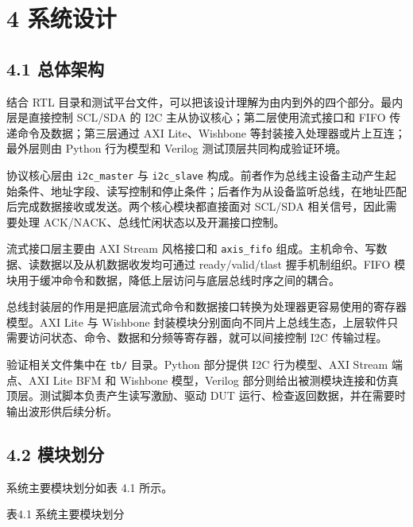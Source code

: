 \section{4 系统设计}\label{ux7cfbux7edfux8bbeux8ba1}

\subsection{4.1 总体架构}\label{ux603bux4f53ux67b6ux6784}

结合 RTL
目录和测试平台文件，可以把该设计理解为由内到外的四个部分。最内层是直接控制
SCL/SDA 的 I2C 主从协议核心；第二层使用流式接口和 FIFO
传递命令及数据；第三层通过 AXI Lite、Wishbone
等封装接入处理器或片上互连；最外层则由 Python 行为模型和 Verilog
测试顶层共同构成验证环境。

协议核心层由 \texttt{i2c\_master} 与 \texttt{i2c\_slave}
构成。前者作为总线主设备主动产生起始条件、地址字段、读写控制和停止条件；后者作为从设备监听总线，在地址匹配后完成数据接收或发送。两个核心模块都直接面对
SCL/SDA 相关信号，因此需要处理 ACK/NACK、总线忙闲状态以及开漏接口控制。

流式接口层主要由 AXI Stream 风格接口和 \texttt{axis\_fifo}
组成。主机命令、写数据、读数据以及从机数据收发均可通过 ready/valid/tlast
握手机制组织。FIFO
模块用于缓冲命令和数据，降低上层访问与底层总线时序之间的耦合。

总线封装层的作用是把底层流式命令和数据接口转换为处理器更容易使用的寄存器模型。AXI
Lite 与 Wishbone
封装模块分别面向不同片上总线生态，上层软件只需要访问状态、命令、数据和分频等寄存器，就可以间接控制
I2C 传输过程。

验证相关文件集中在 \texttt{tb/} 目录。Python 部分提供 I2C 行为模型、AXI
Stream 端点、AXI Lite BFM 和 Wishbone 模型，Verilog
部分则给出被测模块连接和仿真顶层。测试脚本负责产生读写激励、驱动 DUT
运行、检查返回数据，并在需要时输出波形供后续分析。

\subsection{4.2 模块划分}\label{ux6a21ux5757ux5212ux5206}

系统主要模块划分如表 4.1 所示。

表4.1 系统主要模块划分

